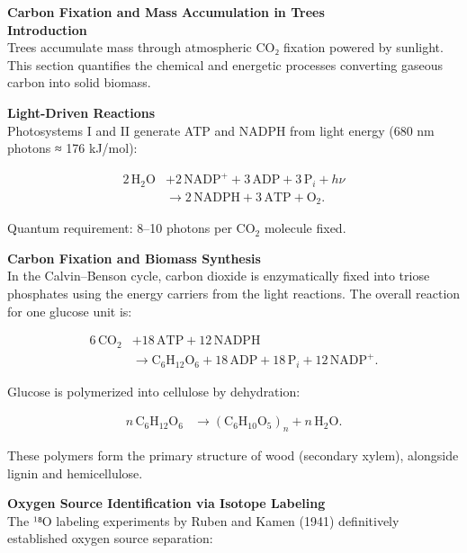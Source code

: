 \begin{technical}
{\Large\textbf{Carbon Fixation and Mass Accumulation in Trees}}\\[0.7em]

\noindent\textbf{Introduction}\\[0.5em]
Trees accumulate mass through atmospheric CO₂ fixation powered by sunlight. This section quantifies the chemical and energetic processes converting gaseous carbon into solid biomass.

\noindent\textbf{Light-Driven Reactions}\\[0.5em]
Photosystems I and II generate ATP and NADPH from light energy (680 nm photons ≈ 176 kJ/mol):

\vspace{0.3em}
\begin{align}
2\,\mathrm{H}_2\mathrm{O} 
&+ 2\,\mathrm{NADP}^+ 
+ 3\,\mathrm{ADP} 
+ 3\,\mathrm{P}_i 
+ h\nu \nonumber \\
&\rightarrow 2\,\mathrm{NADPH} 
+ 3\,\mathrm{ATP} 
+ \mathrm{O}_2.
\end{align}

Quantum requirement: 8–10 photons per \(\mathrm{CO}_2\) molecule fixed.

\noindent\textbf{Carbon Fixation and Biomass Synthesis}\\[0.5em]
In the Calvin–Benson cycle, carbon dioxide is enzymatically fixed into triose phosphates using the energy carriers from the light reactions. The overall reaction for one glucose unit is:

\begin{align}
6\,\mathrm{CO}_2 
&+ 18\,\mathrm{ATP} 
+ 12\,\mathrm{NADPH} \nonumber \\
&\rightarrow \mathrm{C}_6\mathrm{H}_{12}\mathrm{O}_6 
+ 18\,\mathrm{ADP} 
+ 18\,\mathrm{P}_i 
+ 12\,\mathrm{NADP}^+.
\end{align}

Glucose is polymerized into cellulose by dehydration:

\begin{align}
n\,\mathrm{C}_6\mathrm{H}_{12}\mathrm{O}_6 
&\rightarrow (\mathrm{C}_6\mathrm{H}_{10}\mathrm{O}_5)_n 
+ n\,\mathrm{H}_2\mathrm{O}.
\end{align}

These polymers form the primary structure of wood (secondary xylem), alongside lignin and hemicellulose.

\noindent\textbf{Oxygen Source Identification via Isotope Labeling}\\[0.5em]
The ¹⁸O labeling experiments by Ruben and Kamen (1941) definitively established oxygen source separation:


\end{technical}
